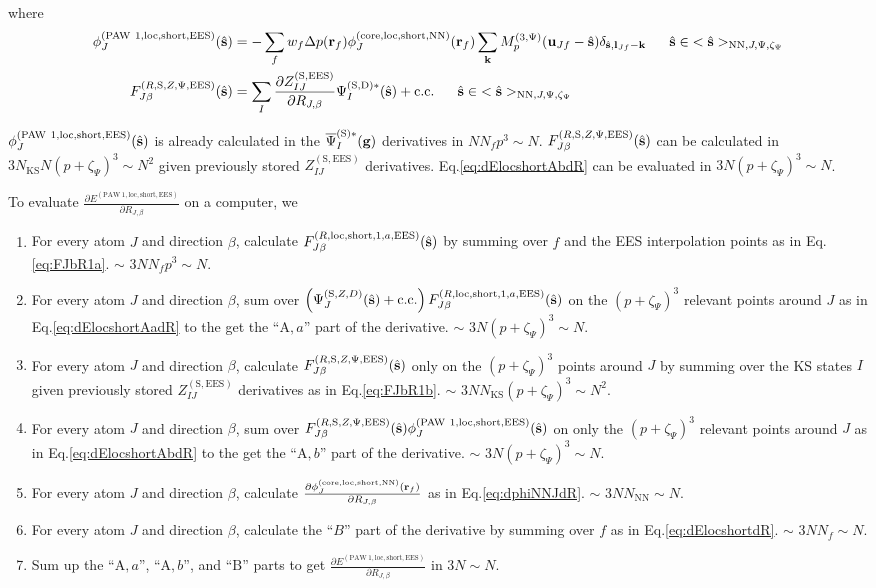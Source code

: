 \documentclass[paper=a4, fontsize=11pt]{article} %
\numberwithin{equation}{section} %
\numberwithin{figure}{section} %
\numberwithin{table}{section} %
\newcommand{\p}{\partial}
\newcommand{\bu}{{\bf{u}}}
\newcommand{\bl}{{\bf{l}}}
\newcommand{\bk}{{\bf{k}}}
\newcommand{\bs}{{\bf{s}}}
\newcommand{\bg}{{\bf{g}}}
\newcommand{\br}{{\bf{r}}}
\newcommand{\hs}{{\hat{\bf{s}}}}
\newcommand{\rS}{{\mathrm{S}}}
\newcommand{\rEES}{{\mathrm{EES}}}
\newcommand{\rcore}{{\mathrm{core}}}
\newcommand{\rNN}{{\mathrm{NN}}}
\newcommand{\rshort}{{\mathrm{short}}}
\newcommand{\rcc}{{\mathrm{c.c.}}}
\newcommand{\rP}{{\mathrm{PAW}}}
\newcommand{\rA}{{\mathrm{A}}}
\newcommand{\rB}{{\mathrm{B}}}
\newcommand{\rD}{{\mathrm{D}}}
\newcommand{\rlo}{{\mathrm{loc}}}
\newcommand{\psigsc}{{\overline \Psi_I^{(\rS)*}(\bg)}}
\newcommand{\RJb}{{R_{J,\beta}}}
\newcommand{\NKS}{{N_{\mathrm{KS}}}}
\newcommand{\Mp}{{M_p^{(3,\Psi)}}}
\newcommand{\pzp}{{(p+\zeta_{\Psi})^3}}
\newcommand{\hsJp}{{<\hs>_{\rNN,J,\Psi,\zeta_\Psi}}}
\newcommand{\hsinJp}{{\ \ \ \ \ \hs  \in  \hsJp}}
\begin{document}
where
\begin{equation}\label{eq:FJbR1b}
\begin{split}
\phi_J^{(\rP\ 1,\rlo,\rshort,\rEES)}(\hs) &= -\sum_f w_f \Delta p(\br_f) \phi_J^{(\rcore,\rlo,\rshort,\rNN)}(\br_f)  \sum_{\bk} \Mp(\bu_{Jf}-\hat \bs)\delta_{\hat \bs,\bl_{Jf}-\bk} \hsinJp\\
F_{J\beta}^{(R,\rS,Z,\Psi,\rEES)}(\hs) &= \sum_I \frac{\p Z_{IJ}^{(\rS,\rEES)}}{\p \RJb}\Psi_I^{(\rS,\rD)*}(\hat \bs) + \rcc \hsinJp \\
\end{split}
\end{equation}

$\phi_J^{(\rP\ 1,\rlo,\rshort,\rEES)}(\hs)$ is already calculated in the $\psigsc$ derivatives in $NN_fp^3 \sim N$. $F_{J\beta}^{(R,\rS,Z,\Psi,\rEES)}(\hs)$ can be calculated in $3\NKS N\pzp \sim N^2$ given previously stored $Z_{IJ}^{(\rS,\rEES)}$ derivatives. Eq.\eqref{eq:dElocshortAbdR} can be evaluated in $3N \pzp \sim N$.

To evaluate $\frac{\p E^{(\rP\ 1,\rlo,\rshort,\rEES)}}{\p \RJb}$ on a computer, we
\begin{enumerate}
\item For every atom $J$ and direction $\beta$, calculate $F_{J\beta}^{(R,\rlo,\rshort,1,a,\rEES)}(\hs)$ by summing over $f$ and the EES interpolation points as in Eq.\eqref{eq:FJbR1a}. $\sim$ $3 N N_f p^3 \sim N$.
\item For every atom $J$ and direction $\beta$, sum over $\left(\Psi_J^{(\rS,Z,D)}(\hs)+ \rcc\right) F_{J\beta}^{(R,\rlo,\rshort,1,a,\rEES)}(\hs)$ on the $\pzp$ relevant points around $J$ as in Eq.\eqref{eq:dElocshortAadR} to the get the ``$\rA,a$'' part of the derivative. $\sim$ $3N \pzp \sim N$.
\item For every atom $J$ and direction $\beta$, calculate $F_{J\beta}^{(R,\rS,Z,\Psi,\rEES)}(\hs)$ only on the $\pzp$ points around $J$ by summing over the KS states $I$ given previously stored $Z_{IJ}^{(\rS,\rEES)}$ derivatives as in Eq.\eqref{eq:FJbR1b}. $\sim$ $3 N \NKS \pzp \sim N^2$.
\item For every atom $J$ and direction $\beta$, sum over $F_{J\beta}^{(R,\rS,Z,\Psi,\rEES)}(\hs)\phi_J^{(\rP\ 1,\rlo,\rshort,\rEES)}(\hs)$ on only the $\pzp$ relevant points around $J$ as in Eq.\eqref{eq:dElocshortAbdR} to the get the ``$\rA,b$'' part of the derivative. $\sim$ $3N \pzp \sim N$.
\item For every atom $J$ and direction $\beta$, calculate $\frac{\p \phi_J^{(\rcore,\rlo,\rshort,\rNN)}(\br_f)}{\p \RJb}$ as in Eq.\eqref{eq:dphiNNJdR}. $\sim$ $3 N N_\rNN \sim N$.
\item For every atom $J$ and direction $\beta$, calculate the ``$B$'' part of the derivative by summing over $f$ as in Eq.\eqref{eq:dElocshortdR}. $\sim$ $3N N_f \sim N$.
\item Sum up the ``$\rA,a$'', ``$\rA,b$'', and ``$\rB$'' parts to get $\frac{\p E^{(\rP\ 1,\rlo,\rshort,\rEES)}}{\p \RJb}$ in $3 N\sim N$.
\end{enumerate}
\end{document}
